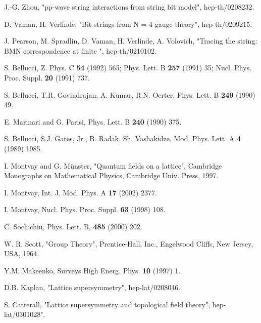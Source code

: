 \documentclass[a4paper]{article}
\begin{document}
\begin{thebibliography}{99}
 J.-G. Zhou, "pp-wave string interactions from string bit model",
hep-th/0208232.

 D. Vaman,
H. Verlinde, "Bit strings from {N} = 4 gauge theory", hep-th/0209215.

 J. Pearson, M. Spradlin, D. Vaman,
H. Verlinde, A. Volovich, "Tracing the string: {BMN} correspondence at finite \coordHE{}",
hep-th/0210102.

S. Bellucci, Z. Phys. C {\bf 54} (1992) 565; Phys. Lett. B {\bf 257} (1991) 35; Nucl. Phys. Proc. Suppl. {\bf 20} (1991) 737.

S. Bellucci, T.R. Govindrajan, A. Kumar, R.N. Oerter, Phys. Lett. B {\bf 249} (1990) 49.

 E. Marinari and G. Parisi, Phys. Lett. B {\bf 240} (1990) 375.

 S. Bellucci, S.J. Gates, Jr., B. Radak, Sh. Vashakidze,
Mod. Phys. Lett. A {\bf 4} (1989) 1985.

 I. Montvay and G. {M\"{u}nster},
"Quantum fields on a lattice", Cambridge Monographs on Mathematical Physics,
Cambridge Univ. Press, 1997.

I. Montvay, Int. J. Mod. Phys. A {\bf 17} (2002) 2377.

I. Montvay, Nucl. Phys. Proc. Suppl. {\bf 63} (1998) 108.

C. Sochichiu, Phys. Lett. B, {\bf 485} (2000) 202.

 W. R. Scott, "Group Theory", Prentice-Hall, Inc., Engelwood Cliffs, New Jersey,
USA, 1964.

 Y.M. Makeenko, Surveys High Energ. Phys. {\bf 10} (1997) 1.

D.B. Kaplan, "Lattice supersymmetry", hep-lat/0208046.

S. Catterall,
"Lattice supersymmetry and topological field theory",
hep-lat/0301028".

\end{thebibliography}
\end{document}
